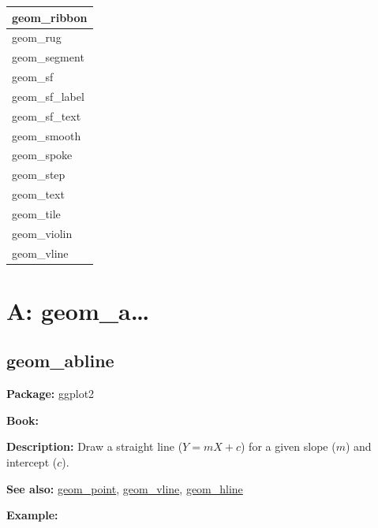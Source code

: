 \documentclass[
]{book}
\begin{document}
\begin{tabular}{l}
\hline
geom\_ribbon\\
\hline
geom\_rug\\
\hline
geom\_segment\\
\hline
geom\_sf\\
\hline
geom\_sf\_label\\
\hline
geom\_sf\_text\\
\hline
geom\_smooth\\
\hline
geom\_spoke\\
\hline
geom\_step\\
\hline
geom\_text\\
\hline
geom\_tile\\
\hline
geom\_violin\\
\hline
geom\_vline\\
\hline
\end{tabular}

\hypertarget{a-geom_a}{%
\chapter{A: geom\_a\ldots{}}\label{a-geom_a}}

\hypertarget{abline}{%
\section{geom\_abline}\label{abline}}

\textbf{Package: } ggplot2 \autocite{R-ggplot2}

\textbf{Book: }

\textbf{Description: } Draw a straight line (\(Y=mX+c\)) for a given slope (\(m\)) and intercept (\(c\)).

\textbf{See also: } \protect\hyperlink{point}{geom\_point}, \protect\hyperlink{vline}{geom\_vline}, \protect\hyperlink{hline}{geom\_hline}

\textbf{Example:}
\end{document}

